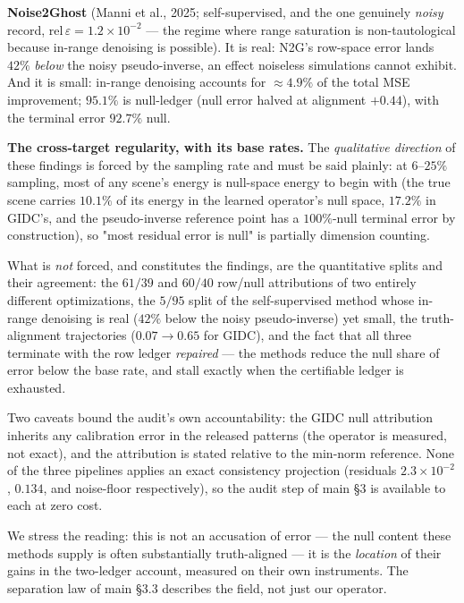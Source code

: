 \documentclass[11pt]{article}
\begin{document}
\textbf{Noise2Ghost} (Manni et al., 2025; self-supervised, and the one genuinely \textit{noisy} record, $\mathrm{rel}\,\varepsilon = 1.2\times10^{-2}$ --- the regime where range saturation is non-tautological because in-range denoising is possible). It is real: N2G's row-space error lands $42\%$ \textit{below} the noisy pseudo-inverse, an effect noiseless simulations cannot exhibit. And it is small: in-range denoising accounts for ${\approx}4.9\%$ of the total MSE improvement; $95.1\%$ is null-ledger (null error halved at alignment $+0.44$), with the terminal error $92.7\%$ null.


\textbf{The cross-target regularity, with its base rates.} The \textit{qualitative direction} of these findings is forced by the sampling rate and must be said plainly: at $6$--$25\%$ sampling, most of any scene's energy is null-space energy to begin with (the true scene carries $10.1\%$ of its energy in the learned operator's null space, $17.2\%$ in GIDC's, and the pseudo-inverse reference point has a $100\%$-null terminal error by construction), so "most residual error is null" is partially dimension counting.

What is \textit{not} forced, and constitutes the findings, are the quantitative splits and their agreement: the $61/39$ and $60/40$ row/null attributions of two entirely different optimizations, the $5/95$ split of the self-supervised method whose in-range denoising is real ($42\%$ below the noisy pseudo-inverse) yet small, the truth-alignment trajectories ($0.07 \to 0.65$ for GIDC), and the fact that all three terminate with the row ledger \textit{repaired} --- the methods reduce the null share of error below the base rate, and stall exactly when the certifiable ledger is exhausted.

Two caveats bound the audit's own accountability: the GIDC null attribution inherits any calibration error in the released patterns (the operator is measured, not exact), and the attribution is stated relative to the min-norm reference. None of the three pipelines applies an exact consistency projection (residuals $2.3\times10^{-2}$, $0.134$, and noise-floor respectively), so the audit step of main §3 is available to each at zero cost.

We stress the reading: this is not an accusation of error --- the null content these methods supply is often substantially truth-aligned --- it is the \textit{location} of their gains in the two-ledger account, measured on their own instruments. The separation law of main §3.3 describes the field, not just our operator.
\end{document}
